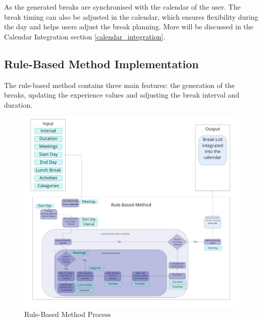 \documentclass{hasel_thesis}
\begin{document}
As the generated breaks are synchronised with the calendar of the user. The break timing can also be adjusted in the calendar, which ensures flexibility during the day and helps users adjust the break planning. More will be discussed in the Calendar Integration section \ref{calendar_integration}.


\subsection{Rule-Based Method Implementation} \label{rule-based-method-implementation}

The rule-based method contains three main features: the generation of the breaks, updating the experience values and adjusting the break interval and duration.

\begin{figure}[htp]
    \centering
    \includegraphics[width=15cm]{hasel_thesis/images/rule-based_method.png}
    \caption{Rule-Based Method Process}
    \label{fig:rule-based_method}
\end{figure}
\end{document}
